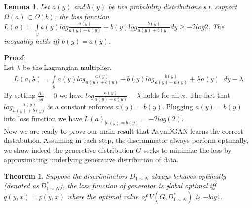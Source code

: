 \documentclass{article}
\newtheorem{thm}{Theorem}
\newtheorem{lemma}{Lemma}
\theoremstyle{definition}
\begin{document}
	\begin{lemma} \label{lem2}
		Let $a(y)$ and $b(y)$ be two probability distributions s.t. support  $\Omega(a)\subset \Omega(b)$, the loss function $L(a)=\int\limits_{y} a(y)log\frac{a(y)}{a(y)+b(y)}+b(y)log\frac{b(y)}{a(y)+b(y)} dy \geq  -2 log2$. The inequality holds iff $b(y)=a(y)$.
	\end{lemma}
	
	\textbf{Proof}:\\
	Let $\lambda$ be the Lagrangian multiplier. 
	\begin{equation}
	\begin{aligned}
	L(a,\lambda)=\int\limits_{y} a(y)log\frac{a(y)}{a(y)+b(y)}+b(y)log\frac{b(y)}{a(y)+a(y)} + \lambda a(y) \;\;dy -\lambda
	\end{aligned}
	\end{equation}
	By setting $\frac{\partial L}{\partial a} =0$ we have $log\frac{a(y)}{a(y)+b(y)}=\lambda$ holds for all $x$. The fact that $log\frac{a(y)}{a(y)+b(y)}$ is a constant enforces $a(y)=b(y)$. Plugging $a(y)=b(y)$ into loss function we have $L(a)_{|a(y)=b(y)}=-2log(2)$.  \\
	Now we are ready to prove our main result that AsynDGAN learns the correct distribution. Assuming in each step, the discriminator always perform optimally, we show indeed the generative distribution $G$ seeks to minimize the loss by approximating underlying generative distribution of data.
	\begin{thm}
		Suppose the discriminators $D_{1\sim N}$ always behaves optimally (denoted as $D^*_{1 \sim N}$), the loss function of generator is global optimal iff $q(y,x)=p(y,x)$ where the optimal value of $V(G,D^*_{1\sim N})$ is $-log 4$. 
	\end{thm}
	
\end{document}
